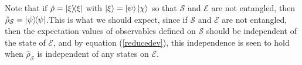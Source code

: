     Note that if $\hat{\rho}=\dyad{\xi}$ with $\ket{\xi}=\ket{\psi}\ket{\chi}$ so that $\mathcal{S}$ and $\mathcal{E}$ are not entangled, then $\hat{\rho}_\mathcal{S}=\dyad{\psi}$.\footnotemark\;This is what we should expect, since if $\mathcal{S}$ and $\mathcal{E}$ are not entangled, then the expectation values of observables defined on $\mathcal{S}$ should be independent of the state of $\mathcal{E}$, and by equation (\ref{reducedev}), this independence is seen to hold when $\hat{\rho}_\mathcal{S}$ is independent of any states on $\mathcal{E}$.
    
